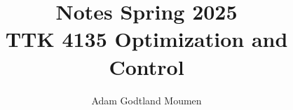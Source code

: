 \documentclass[11pt,a4paper]{article}
\title{Notes Spring 2025\\ \normalsize TTK 4135 Optimization and Control}
\author{Adam Godtland Moumen}
\begin{document}
\begin{titlepage}
    \maketitle
\end{titlepage}
\tableofcontents
\clearpage
{}


\end{document}
